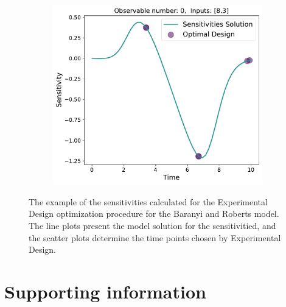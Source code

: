 \documentclass[10pt,A4paper]{article}
\begin{document}
\begin{figure}[H]
    \begin{subfigure}{.48\textwidth}
        \centering
        \includegraphics[scale=0.38]{Figures/Sensitivities_Results_baranyi_roberts_ode_fisher_determinant_rel_sensit_cont_6times_1temps_v20_000_x_00_p_02.pdf}
    \end{subfigure}
    \caption{{\footnotesize The example of the sensitivities calculated for the Experimental Design optimization procedure for the Baranyi and Roberts model.
    The line plots present the model solution for the sensitivitied, and the scatter plots determine the time points chosen by Experimental Design.}} 
    \label{fig:baranyi_roberts_sensitivities}
    \end{figure}

%
%
%
\section*{Supporting information}
%
%
%
\nolinenumbers

\end{document}

